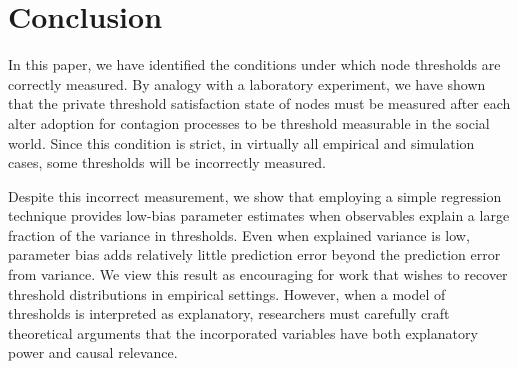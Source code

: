 \documentclass[a4paper]{article}
\begin{document}
\begin{comment}
We view this result as an encouraging result for the influencer maximization problem, for public health researchers interested in effective targeting, and for online platforms that wish to spend advertizing resources wisely \cite{}.

\begin{figure}[h]
\label{fig:rmse_at_k}
\texttt{[image: RMSE\_at\_k.png]}
\caption{Example of the slope bias. The red line is the relationship between $x$ and $y$ in the population, and the blue line is the relationship in the correctly measured subset.}
\end{figure}

\begin{figure}[h]
\label{fig:graph_rmse_at_k}
\texttt{[image: graph\_rmse\_at\_k.png]}
\caption{Example of the slope bias. The red line is the relationship between $x$ and $y$ in the population, and the blue line is the relationship in the correctly measured subset.}
\end{figure}

\begin{enumerate}
\item The rate of correct measurement
\item Our ability to explain the measured cases with regression based on obsevables
\item How imputed thresholds differ from the exposure-at-activation time method
\end{enumerate}

This dataset comes with three types of social relations, along with adoption dates and actor-level variables. We follow \cite{Valente1996} <<METHODS>>

\end{comment}

\section{Conclusion}

In this paper, we have identified the conditions under which node thresholds are correctly measured. By analogy with a laboratory experiment, we have shown that the private threshold satisfaction state of nodes must be measured after each alter adoption for contagion processes to be threshold measurable in the social world. Since this condition is strict, in virtually all empirical and simulation cases, some thresholds will be incorrectly measured.

Despite this incorrect measurement, we show that employing a simple regression technique provides low-bias parameter estimates when observables explain a large fraction of the variance in thresholds. Even when explained variance is low, parameter bias adds relatively little prediction error beyond the prediction error from variance. We view this result as encouraging for work that wishes to recover threshold distributions in empirical settings. However, when a model of thresholds is interpreted as explanatory, researchers must carefully craft theoretical arguments that the incorporated variables have both explanatory power and causal relevance.
\end{document}
